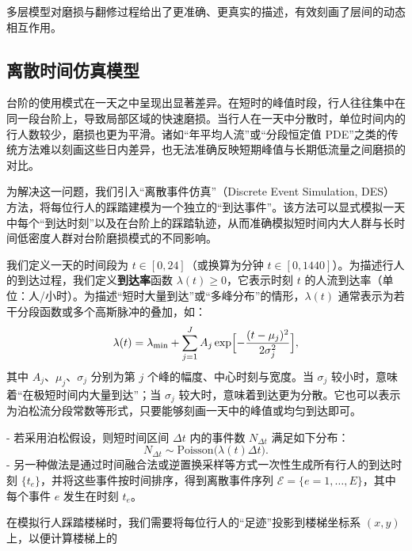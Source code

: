 \documentclass[11pt,a4paper,fontset=windows]{ctexart}
\begin{document}
多层模型对磨损与翻修过程给出了更准确、更真实的描述，有效刻画了层间的动态相互作用。

\subsection{离散时间仿真模型}

台阶的使用模式在一天之中呈现出显著差异。在短时的峰值时段，行人往往集中在同一段台阶上，导致局部区域的快速磨损。当行人在一天中分散时，单位时间内的行人数较少，磨损也更为平滑。诸如“年平均人流”或“分段恒定值 PDE”之类的传统方法难以刻画这些日内差异，也无法准确反映短期峰值与长期低流量之间磨损的对比。

为解决这一问题，我们引入“离散事件仿真”（Discrete Event Simulation, DES）方法，将每位行人的踩踏建模为一个独立的“到达事件”。该方法可以显式模拟一天中每个“到达时刻”以及在台阶上的踩踏轨迹，从而准确模拟短时间内大人群与长时间低密度人群对台阶磨损模式的不同影响。

我们定义一天的时间段为 $t\in[0,24]$（或换算为分钟 $t\in[0,1440]$）。为描述行人的到达过程，我们定义\textbf{到达率}函数 $\lambda(t)\ge0$，它表示时刻 $t$ 的人流到达率（单位：人/小时）。为描述“短时大量到达”或“多峰分布”的情形，$\lambda(t)$ 通常表示为若干分段函数或多个高斯脉冲的叠加，如：
\begin{equation}
\lambda(t)=\lambda_{\min}+\sum_{j=1}^{J}A_j\exp\Bigl[-\frac{(t-\mu_j)^2}{2\sigma_j^{2}}\Bigr],
\end{equation}
其中 $A_j$、$\mu_j$、$\sigma_j$ 分别为第 $j$ 个峰的幅度、中心时刻与宽度。当 $\sigma_j$ 较小时，意味着“在极短时间内大量到达”；当 $\sigma_j$ 较大时，意味着到达更为分散。它也可以表示为泊松流分段常数等形式，只要能够刻画一天中的峰值或均匀到达即可。

- 若采用泊松假设，则短时间区间 $\Delta t$ 内的事件数 $N_{\Delta t}$ 满足如下分布：
\begin{equation}
N_{\Delta t}\sim\text{Poisson}\bigl(\lambda(t)\Delta t\bigr).
\end{equation}
- 另一种做法是通过时间融合法或逆置换采样等方式一次性生成所有行人的到达时刻 $\{t_e\}$，并将这些事件按时间排序，得到离散事件序列 $\mathcal{E}=\{e=1,\dots,E\}$，其中每个事件 $e$ 发生在时刻 $t_e$。

在模拟行人踩踏楼梯时，我们需要将每位行人的“足迹”投影到楼梯坐标系 $(x,y)$ 上，以便计算楼梯上的
\end{document}
